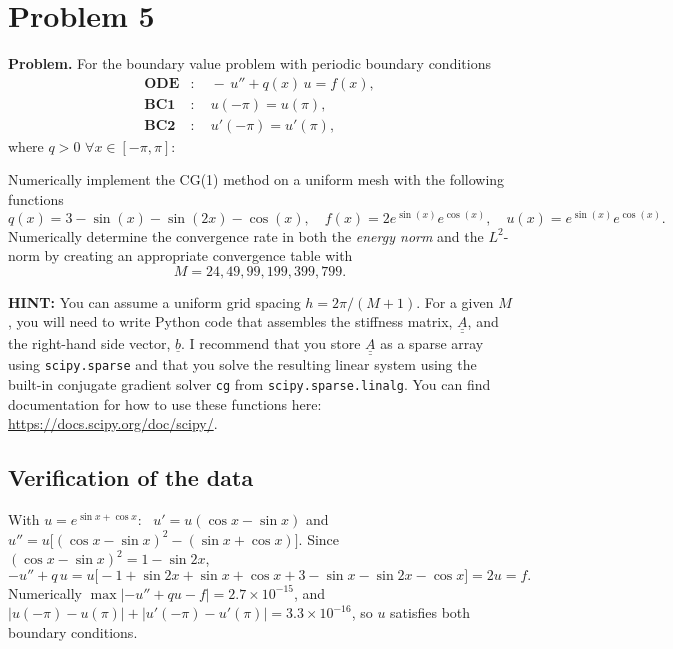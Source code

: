 \documentclass[11pt]{article}
\begin{document}
 

\vspace{0.8em}
\section*{Problem 5}

\textbf{Problem.} For the boundary value problem with periodic boundary
conditions
\begin{align*}
  \textbf{ODE} &: \quad -\,u''+q(x)\,u=f(x),\\
  \textbf{BC1} &: \quad u(-\pi)=u(\pi),\\
  \textbf{BC2} &: \quad u'(-\pi)=u'(\pi),
\end{align*}
where $q>0$ $\forall x\in[-\pi,\pi]$:

\medskip
Numerically implement the CG(1) method on a uniform mesh with the following
functions
\[
  q(x)=3-\sin(x)-\sin(2x)-\cos(x),\quad
  f(x)=2e^{\sin(x)}e^{\cos(x)},\quad
  u(x)=e^{\sin(x)}e^{\cos(x)}.
\]
Numerically determine the convergence rate in both the \emph{energy norm} and
the $L^{2}$-norm by creating an appropriate convergence table with
\[
  M=24,49,99,199,399,799.
\]

\textbf{HINT:} You can assume a uniform grid spacing $h=2\pi/\left(M+1\right)$.
For a given $M$, you will need to write Python code that assembles the stiffness
matrix, $\underline{\underline{A}}$, and the right-hand side vector,
$\underline{b}$. I recommend that you store $\underline{\underline{A}}$ as a
sparse array using \texttt{scipy.sparse} and that you solve the resulting linear
system using the built-in conjugate gradient solver \texttt{cg} from
\texttt{scipy.sparse.linalg}. You can find documentation for how to use these
functions here: \url{https://docs.scipy.org/doc/scipy/}.

\subsection*{Verification of the data}

With $u=e^{\sin x+\cos x}$: \ $u'=u(\cos x-\sin x)$ and
$u''=u\bigl[(\cos x-\sin x)^{2}-(\sin x+\cos x)\bigr]$. Since
$(\cos x-\sin x)^{2}=1-\sin 2x$,
\begin{equation}\label{eq:p5check}
  -u''+q\,u
   =u\bigl[-1+\sin 2x+\sin x+\cos x+3-\sin x-\sin 2x-\cos x\bigr]=2u=f .
\end{equation}
Numerically $\max|-u''+qu-f|=2.7\times10^{-15}$, and
$|u(-\pi)-u(\pi)|+|u'(-\pi)-u'(\pi)|=3.3\times10^{-16}$, so $u$ satisfies both
boundary conditions.
\end{document}
